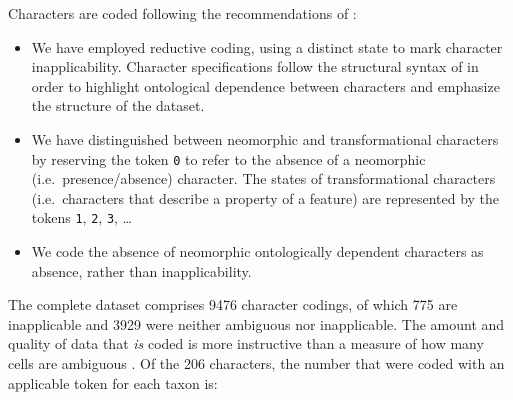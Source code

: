 \documentclass[openany]{book}
\theoremstyle{definition}
\theoremstyle{definition}
\theoremstyle{definition}
\theoremstyle{remark}
\begin{document}
Characters are coded following the recommendations of
\citet{Brazeau2018}:

\begin{itemize}
\item
  We have employed reductive coding, using a distinct state to mark
  character inapplicability. Character specifications follow the
  structural syntax of \citet{Sereno2007} in order to highlight
  ontological dependence between characters and emphasize the structure
  of the dataset.
\item
  We have distinguished between neomorphic and transformational
  characters \citep[sensu][]{Sereno2007} by reserving the token
  \texttt{0} to refer to the absence of a neomorphic
  (i.e.~presence/absence) character. The states of transformational
  characters (i.e.~characters that describe a property of a feature) are
  represented by the tokens \texttt{1}, \texttt{2}, \texttt{3}, \ldots{}
\item
  We code the absence of neomorphic ontologically dependent characters
  \citep[sensu][]{Vogt2017} as absence, rather than inapplicability.
\end{itemize}

The complete dataset comprises 9476 character codings, of which 775 are
inapplicable and 3929 were neither ambiguous nor inapplicable. The
amount and quality of data that \emph{is} coded is more instructive than
a measure of how many cells are ambiguous \citep{Wiens1998, Wiens2003}.
Of the 206 characters, the number that were coded with an applicable
token for each taxon is:
\end{document}
